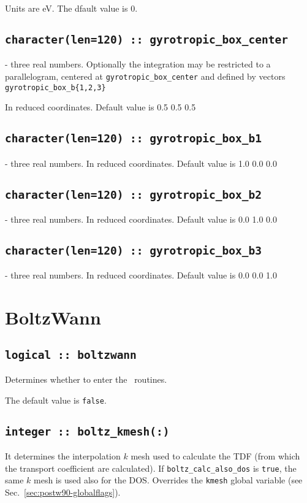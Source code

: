Units are eV. The  dfault value is 0.

\subsection[gyrotropic\_box\_center]{\tt  character(len=120) :: gyrotropic\_box\_center} - three real numbers.
Optionally the integration may be restricted to a parallelogram, centered at {\tt gyrotropic\_box\_center}
and defined by vectors {\tt gyrotropic\_box\_b\{1,2,3\}}

In reduced coordinates. Default value is 0.5 0.5 0.5

\subsection[gyrotropic\_box\_b1]{\tt  character(len=120) :: gyrotropic\_box\_b1} - three real numbers.
In reduced coordinates. Default value is 1.0 0.0 0.0

\subsection[gyrotropic\_box\_b2]{\tt  character(len=120) :: gyrotropic\_box\_b2} - three real numbers.
In reduced coordinates. Default value is 0.0 1.0 0.0

\subsection[gyrotropic\_box\_b3]{\tt  character(len=120) :: gyrotropic\_box\_b3} - three real numbers.
In reduced coordinates. Default value is 0.0 0.0 1.0

\clearpage
\section{BoltzWann}
\subsection[boltzwann]{\tt logical :: boltzwann}
Determines whether to enter the \bw\ routines.

The default value is \verb#false#.

\subsection[boltz\_kmesh]{\tt integer :: boltz\_kmesh(:)}
It determines the interpolation $k$ mesh used to calculate the TDF (from which the transport coefficient are calculated). If {\tt boltz\_calc\_also\_dos} is \verb#true#, the same $k$ mesh is used also for the DOS.
Overrides the \verb#kmesh# global variable (see
Sec.~\ref{sec:postw90-globalflags}).

